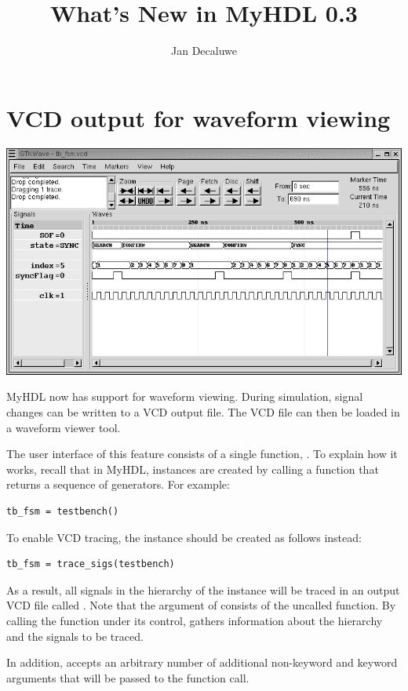 \documentclass{howto}
\title{What's New in MyHDL 0.3}
\author{Jan Decaluwe}
\begin{document}
\maketitle
\tableofcontents


\section{VCD output for waveform viewing\label{section-wave}}

\ifpdf
\includegraphics{tbfsm.png}
\fi

MyHDL now has support for waveform viewing. During simulation, signal
changes can be written to a VCD output file.  The VCD file can then be
loaded in a waveform viewer tool.

The user interface of this feature consists of a single function,
.  To explain how it works, recall that in
MyHDL, instances are created by calling a function that returns a
sequence of generators. For example:

\begin{verbatim}
tb_fsm = testbench()
\end{verbatim}

To enable VCD tracing, the instance should be created as 
follows instead:

\begin{verbatim}
tb_fsm = trace_sigs(testbench)
\end{verbatim}

As a result, all signals in the hierarchy of the instance will be
traced in an output VCD file called . Note that the
argument of  consists of the uncalled
function. By calling the function under its control,
 gathers information about the hierarchy and
the signals to be traced.

In addition,  accepts an arbitrary number of
additional non-keyword and keyword arguments that will be passed
to the function call.
\end{document}
